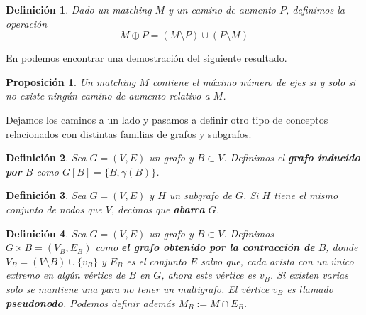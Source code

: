 \documentclass[twoside,a4paper,openright,12pt]{book}
\newtheorem{defi}{Definici\'on}[section]
\newtheorem{prop}{Proposici\'on}[section]
\begin{document}
\begin{defi} 
Dado un matching $M$ y un camino de aumento $P$, definimos la operación 
$$
M\oplus P = (M\setminus P)\cup (P\setminus M)
$$
\end{defi}
En \cite{inte} podemos encontrar una demostración del siguiente resultado.
\begin{prop}
Un matching $M$ contiene el máximo número de ejes si y solo si no existe ningún camino de aumento relativo a $M$.
\end{prop}
Dejamos los caminos a un lado y pasamos a definir otro tipo de conceptos relacionados con distintas familias de grafos y subgrafos.
\begin{defi}
Sea $G=(V,E)$ un grafo y $B \subset V$. Definimos el \textbf{grafo inducido por }$B$ como $G[B] = \{B,\gamma(B)\}$.  
\end{defi}
\begin{defi}
Sea $G=(V,E)$ y $H$ un subgrafo de $G$. Si $H$ tiene el mismo conjunto de nodos que $V$, decimos que \textbf{abarca }$G$.
\end{defi}
\begin{defi}
Sea $G=(V,E)$ un grafo y $B\subset V$. Definimos $G \times B=(V_B,E_B)$ como \textbf{el grafo obtenido por la contracción de} $B$, donde $V_B = (V \setminus B)\cup \{v_B\}$ y $E_B$ es el conjunto $E$ salvo que, cada arista con un único extremo en algún vértice de $B$ en $G$, ahora este vértice es $v_B$. Si existen varias solo se mantiene una para no tener un multigrafo. El vértice $v_B$ es llamado \textbf{pseudonodo}. Podemos definir además $M_B:= M\cap E_B$.
\end{defi}
\end{document}
